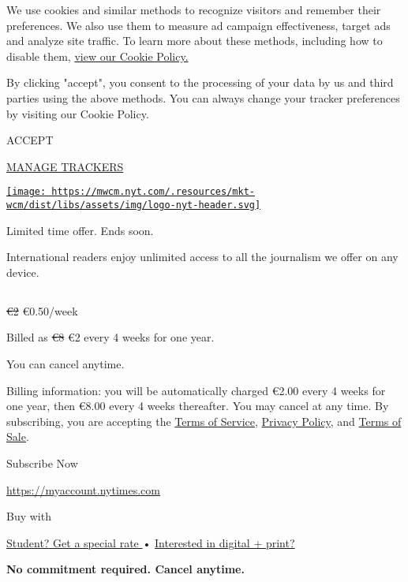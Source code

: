 We use cookies and similar methods to recognize visitors and remember
their preferences. We also use them to measure ad campaign
effectiveness, target ads and analyze site traffic. To learn more about
these methods, including how to disable them,
\href{https://nytimes.com/cookie-policy}{view our Cookie Policy.}

By clicking "accept", you consent to the processing of your data by us
and third parties using the above methods. You can always change your
tracker preferences by visiting our Cookie Policy.

ACCEPT

\href{https://nytimes.com/cookie-policy}{MANAGE TRACKERS}

\href{https://www.nytimes.com/}{\texttt{[image: https://mwcm.nyt.com/.resources/mkt-wcm/dist/libs/assets/img/logo-nyt-header.svg]}}

Limited time offer. Ends soon.

International readers enjoy unlimited access to all the journalism we
offer on any device.

\subsection{}

\sout{€2} €0.50/week

Billed as \sout{€8} €2 every 4 weeks for one year.

You can cancel anytime.

Billing information: you will be automatically charged €2.00 every 4
weeks for one year, then €8.00 every 4 weeks thereafter. You may cancel
at any time. By subscribing, you are accepting the
\href{https://www.nytimes.com/content/help/rights/terms/terms-of-service.html}{Terms
of Service},
\href{https://www.nytimes.com/content/help/rights/privacy/policy/privacy-policy.html}{Privacy
Policy}, and
\href{https://www.nytimes.com/content/help/rights/sale/terms-of-sale.html}{Terms
of Sale}.

\href{https://myaccount.nytimes.com/get-started?OC=20000215740\&campaignId=37WXW}{}

Subscribe Now

\url{https://myaccount.nytimes.com}

Buy with

\href{/subscription/education?campaignId=6JQ7F}{Student? Get a special
rate } • \href{https://subscribe.inyt.com/?campaignId=6JQ7J}{Interested
in digital + print? }

\textbf{No commitment required. Cancel anytime.}

